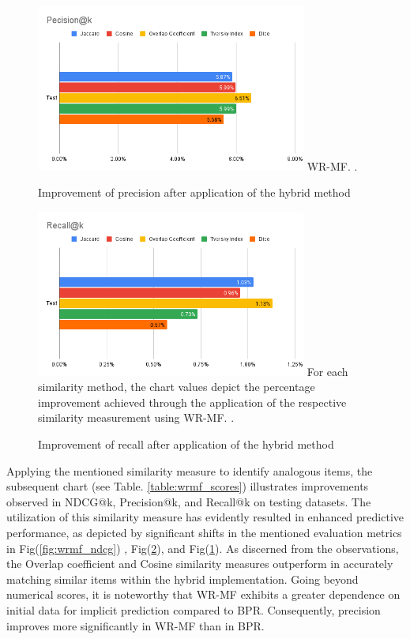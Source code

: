 \documentclass[journal]{IEEEtran}
\begin{document}
\begin{figure}[!t]
  \centering
  \includegraphics[width=3.5in]{picture/WR_MF-Pecision@k.png}
  WR-MF.
  \DeclareGraphicsExtensions.
  \caption{Improvement of precision after application of the hybrid method}
  \label{fig:wrmf_precision}
\end{figure}

\begin{figure}[!t]
  \centering
  \includegraphics[width=3.5in]{picture/WR_MF-Recall@k.png}
  For each similarity method, the chart values depict the percentage improvement achieved through the application of the respective 
  similarity measurement using WR-MF.
  \DeclareGraphicsExtensions.
  \caption{Improvement of recall after application of the hybrid method}
  \label{fig:wrmf_recall}
\end{figure}

Applying the mentioned similarity measure to identify analogous items, the subsequent chart (see Table. \ref{table:wrmf_scores}) illustrates improvements observed in 
NDCG@k, Precision@k, and Recall@k on testing datasets. The utilization of this similarity measure has evidently resulted in 
enhanced predictive performance, as depicted by significant shifts in the mentioned evaluation metrics in Fig(\ref{fig:wrmf_ndcg}) 
, Fig(\ref{fig:wrmf_recall}), and Fig(\ref{fig:wrmf_precision}). As discerned from the observations, the Overlap coefficient and Cosine similarity measures outperform 
in accurately matching similar items within the hybrid implementation. Going beyond numerical scores, it is noteworthy that WR-MF 
exhibits a greater dependence on initial data for implicit prediction compared to BPR. Consequently, precision improves more 
significantly in WR-MF than in BPR.
\end{document}

